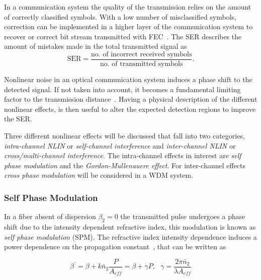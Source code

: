  In a communication system the quality of the transmission relies on the amount of correctly classified symbols. With a low number of misclassified symbols, correction can be implemented in a higher layer of the communication system to recover or correct bit stream transmitted with FEC~\cite{NLPNinCFO}. The SER describes the amount of mistakes made in the total transmitted signal as
 \begin{equation}
\text{SER} = \frac{\text{no. of incorrect received symbols}}{\text{no. of transmitted symbols}}.
\end{equation}

Nonlinear noise in an optical communication system induces a phase shift to the detected signal. If not taken into account, it becomes a fundamental limiting factor to the transmission distance~\cite{NLPNDSP}. Having a physical description of the different nonlinear effects, is then useful to alter the expected detection regions to improve the SER.



 Three different nonlinear effects will be discussed that fall into  two categories, \emph{intra-channel NLIN} or \emph{self-channel interference} and \emph{inter-channel NLIN} or \emph{cross/multi-channel interference}. The intra-channel effects in interest are \emph{self phase modulation } and the \emph{Gordon-Mullenauere effect}. For inter-channel effects \emph{cross phase modulation} will be considered in a WDM system.
  
\subsubsection{Self Phase Modulation}
In a fiber absent of dispersion $\beta_2=0$ the transmitted pulse undergoes a phase shift due to the intensity dependent refractive index, this modulation is known as \textit{self phase modulation }(SPM). The refractive index intensity dependence induces a power dependence on the propagation constant~\cite{FiberAgrawal}, that can be written as~\cite{le2015advanced}  

\begin{equation}
\beta^\prime=\beta+k\bar{n}_2\frac{P}{A_{eff}}=\beta+\gamma P ,\ \ \ \gamma = \frac{2\pi \bar{n}_2}{\lambda A_{eff}}
\label{eq:gammadef}
\end{equation}




